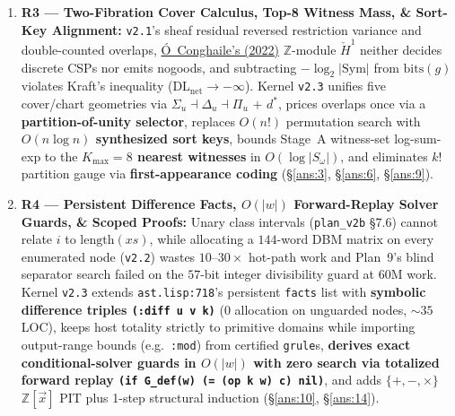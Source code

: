\documentclass[12pt]{article}
\newcommand{\litref}[2]{\hyperlink{lit:#1}{\textcolor{citegreen}{#2}}}
\begin{document}
\begin{enumerate}[leftmargin=1.6em, itemsep=0.28em]
  \item \textbf{R3 --- Two-Fibration Cover Calculus, Top-8 Witness Mass, \& Sort-Key Alignment:} \texttt{v2.1}'s sheaf residual reversed restriction variance and double-counted overlaps, \litref{oconghaile2022}{\'O~Conghaile's (2022)} $\mathbb{Z}$-module $\check{H}^1$ neither decides discrete CSPs nor emits nogoods, and subtracting $-\log_2|\mathrm{Sym}|$ from $\mathrm{bits}(g)$ violates Kraft's inequality ($\mathrm{DL}_{\mathrm{net}} \to -\infty$). Kernel \texttt{v2.3} unifies five cover/chart geometries via $\Sigma_u \dashv \Delta_u \dashv \Pi_u$ $+$ $d^*$, prices overlaps once via a \textbf{partition-of-unity selector}, replaces $O(n!)$ permutation search with \textbf{$O(n\log n)$ synthesized sort keys}, bounds Stage~A witness-set log-sum-exp to the \textbf{$K_{\max}=8$ nearest witnesses} in $O(\log|S_\omega|)$, and eliminates $k!$ partition gauge via \textbf{first-appearance coding} (\S\ref{ans:3}, \S\ref{ans:6}, \S\ref{ans:9}).

  \item \textbf{R4 --- Persistent Difference Facts, $O(|w|)$ Forward-Replay Solver Guards, \& Scoped Proofs:} Unary class intervals (\texttt{plan\_v2b} \S7.6) cannot relate $i$ to $\mathrm{length}(xs)$, while allocating a $144$-word DBM matrix on every enumerated node (\texttt{v2.2}) wastes $10$--$30\times$ hot-path work and Plan~9's blind separator search failed on the $57$-bit integer divisibility guard at $60\mathrm{M}$ work. Kernel \texttt{v2.3} extends \texttt{ast.lisp:718}'s persistent \texttt{facts} list with \textbf{symbolic difference triples \texttt{(:diff u v k)}} ($0$ allocation on unguarded nodes, $\sim 35$ LOC), keeps host totality strictly to primitive domains while importing output-range bounds (e.g.\ \texttt{:mod}) from certified \texttt{grule}s, \textbf{derives exact conditional-solver guards in $O(|w|)$ with zero search via totalized forward replay \texttt{(if G\_def(w) (= (op k w) c) nil)}}, and adds $\{+,-,\times\}$ $\mathbb{Z}[\vec{x}]$ PIT plus 1-step structural induction (\S\ref{ans:10}, \S\ref{ans:14}).


\end{enumerate}
\end{document}
